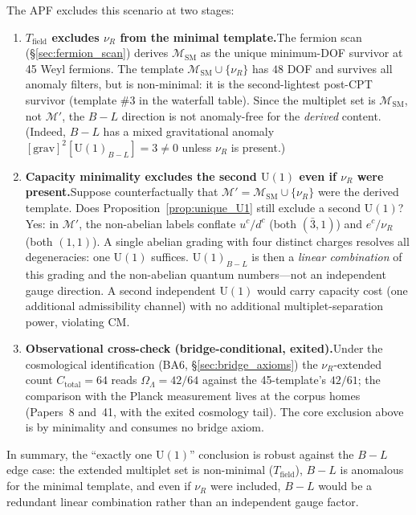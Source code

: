 \documentclass[11pt]{article}
\theoremstyle{definition}
\newcommand{\U}{\mathrm{U}}
\begin{document}
The APF excludes this scenario at two stages:
\begin{enumerate}[label=(\alph*),nosep]
  \item \textbf{$T_{\mathrm{field}}$ excludes $\nu_R$ from the minimal
  template.}\quad The fermion scan (\S\ref{sec:fermion_scan}) derives
  $\mathcal{M}_{\mathrm{SM}}$ as the unique minimum-DOF survivor at
  45 Weyl fermions.  The template
  $\mathcal{M}_{\mathrm{SM}} \cup \{\nu_R\}$ has $48$ DOF and survives
  all anomaly filters, but is non-minimal: it is the second-lightest
  post-CPT survivor (template \#3 in the waterfall table).  Since the
  multiplet set is $\mathcal{M}_{\mathrm{SM}}$, not $\mathcal{M}'$,
  the $B{-}L$ direction is not anomaly-free for the \emph{derived}
  content.  (Indeed, $B{-}L$ has a mixed gravitational anomaly
  $[\mathrm{grav}]^2[\U(1)_{B-L}] = 3 \ne 0$ unless $\nu_R$ is
  present.)
  \item \textbf{Capacity minimality excludes the second $\U(1)$ even
  if $\nu_R$ were present.}\quad Suppose counterfactually that
  $\mathcal{M}' = \mathcal{M}_{\mathrm{SM}} \cup \{\nu_R\}$ were the
  derived template.  Does Proposition~\ref{prop:unique_U1} still
  exclude a second $\U(1)$?  Yes: in $\mathcal{M}'$, the non-abelian
  labels conflate $u^c / d^c$ (both $(\bar{3},1)$) and
  $e^c / \nu_R$ (both $(1,1)$).  A single abelian grading with four
  distinct charges resolves all degeneracies: one $\U(1)$ suffices.
  $\U(1)_{B-L}$ is then a \emph{linear combination} of this grading
  and the non-abelian quantum numbers---not an independent gauge
  direction.  A second independent $\U(1)$ would carry capacity cost
  (one additional admissibility channel) with no additional
  multiplet-separation power, violating CM.
  \item \textbf{Observational cross-check (bridge-conditional,
  exited).}\quad Under the cosmological identification (BA6,
  \S\ref{sec:bridge_axioms}) the $\nu_R$-extended count
  $C_{\mathrm{total}} = 64$ reads $\Omega_\Lambda = 42/64$ against
  the 45-template's $42/61$; the comparison with the Planck
  measurement lives at the corpus homes (Papers~8 and~41, with the
  exited cosmology tail).  The core exclusion above is by minimality
  and consumes no bridge axiom.
\end{enumerate}
In summary, the ``exactly one $\U(1)$'' conclusion is robust against
the $B{-}L$ edge case: the extended multiplet set is non-minimal
($T_{\mathrm{field}}$), $B{-}L$ is anomalous for the minimal template,
and even if $\nu_R$ were included, $B{-}L$ would be a redundant linear
combination rather than an independent gauge factor.
\end{document}

